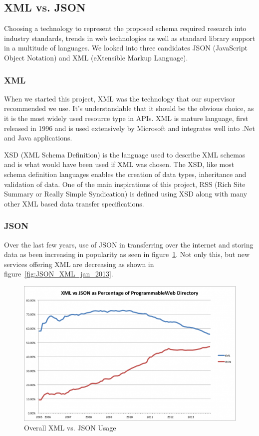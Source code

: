 \documentclass[conference]{IEEEtran}
\begin{document}
\subsection{XML vs. JSON}
Choosing a technology to represent the proposed schema required research into industry standards, trends in web technologies as well as standard library support in a multitude of languages. We looked into three candidates JSON (JavaScript Object Notation) and XML (eXtensible Markup Language).

\subsubsection{XML}
When we started this project, XML was the technology that our supervisor recommended we use. It's understandable that it should be the obvious choice, as it is the most widely used resource type in APIs\cite{maleshkova2010investigating}. XML is mature language, first released in 1996 and is used extensively by Microsoft and integrates well into .Net and Java applications.

XSD (XML Schema Definition) is the language used to describe XML schemas and is what would have been used if XML was chosen. The XSD, like most schema definition languages enables the creation of data types, inheritance and validation of data. One of the main inspirations of this project, RSS (Rich Site Summary or Really Simple Syndication) is defined using XSD along with many other XML based data transfer specifications.

\subsubsection{JSON}
Over the last few years, use of JSON in transferring over the internet and storing data as been increasing in popularity as seen in figure~\ref{fig:JSON_XML_all_time}. Not only this, but new services offering XML are decreasing as shown in figure~\ref{fig:JSON_XML_jan_2013}.

\begin{figure}[h]
	\centering
	\includegraphics[scale=0.37]{images/xml_json_all_time.png}
	\caption{Overall XML vs. JSON Usage\protect\cite{duvander2013json}}
	\label{fig:JSON_XML_all_time}
\end{figure}
\end{document}
